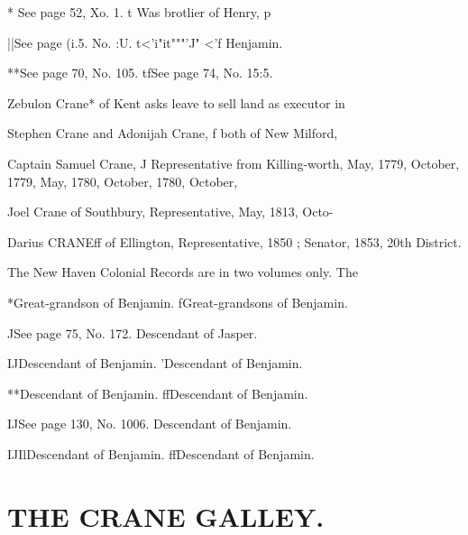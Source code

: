 \documentclass{book}
\begin{document}
* See page 52, Xo. 1. t Was brotlier of Henry, p 


||See page (i.5. No. :U. t<'i"it"""'J" <'f Henjamin. 

**See page 70, No. 105. tfSee page 74, No. 15:5. 




Zebulon Crane* of Kent asks leave to sell land as executor in 

Stephen Crane and Adonijah Crane, f both of New Milford, 

Captain Samuel Crane, J Representative from Killing-worth, 
May, 1779, October, 1779, May, 1780, October, 1780, October, 

Joel Crane of Southbury, Representative, May, 1813, Octo- 




Darius CRANEff of Ellington, Representative, 1850 ; Senator, 
1853, 20th District. 


The New Haven Colonial Records are in two volumes only. The 



*Great-grandson of Benjamin. fGreat-grandsons of Benjamin. 

JSee page 75, No. 172. Descendant of Jasper. 

IJDescendant of Benjamin. 'Descendant of Benjamin. 

**Descendant of Benjamin. ffDescendant of Benjamin. 

IJSee page 130, No. 1006. Descendant of Benjamin. 

IJIlDescendant of Benjamin. ffDescendant of Benjamin. 



\chapter{THE CRANE GALLEY.}
\end{document}
